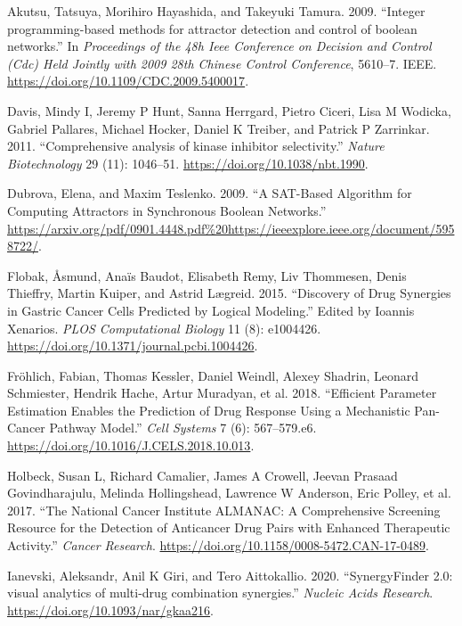 \documentclass[
  12pt,
]{book}
\newlength{\cslhangindent}
\newenvironment{cslreferences}%
  {\setlength{\parindent}{0pt}%
  \everypar{\setlength{\hangindent}{\cslhangindent}}\ignorespaces}%
  {\par}
\begin{document}
\hypertarget{refs}{}
\begin{cslreferences}
\leavevmode\hypertarget{ref-Akutsu2009}{}%
Akutsu, Tatsuya, Morihiro Hayashida, and Takeyuki Tamura. 2009. ``Integer programming-based methods for attractor detection and control of boolean networks.'' In \emph{Proceedings of the 48h Ieee Conference on Decision and Control (Cdc) Held Jointly with 2009 28th Chinese Control Conference}, 5610--7. IEEE. \url{https://doi.org/10.1109/CDC.2009.5400017}.

\leavevmode\hypertarget{ref-Davis2011}{}%
Davis, Mindy I, Jeremy P Hunt, Sanna Herrgard, Pietro Ciceri, Lisa M Wodicka, Gabriel Pallares, Michael Hocker, Daniel K Treiber, and Patrick P Zarrinkar. 2011. ``Comprehensive analysis of kinase inhibitor selectivity.'' \emph{Nature Biotechnology} 29 (11): 1046--51. \url{https://doi.org/10.1038/nbt.1990}.

\leavevmode\hypertarget{ref-Dubrova2009}{}%
Dubrova, Elena, and Maxim Teslenko. 2009. ``A SAT-Based Algorithm for Computing Attractors in Synchronous Boolean Networks.'' \url{https://arxiv.org/pdf/0901.4448.pdf\%20https://ieeexplore.ieee.org/document/5958722/}.

\leavevmode\hypertarget{ref-Flobak2015}{}%
Flobak, Åsmund, Anaïs Baudot, Elisabeth Remy, Liv Thommesen, Denis Thieffry, Martin Kuiper, and Astrid Lægreid. 2015. ``Discovery of Drug Synergies in Gastric Cancer Cells Predicted by Logical Modeling.'' Edited by Ioannis Xenarios. \emph{PLOS Computational Biology} 11 (8): e1004426. \url{https://doi.org/10.1371/journal.pcbi.1004426}.

\leavevmode\hypertarget{ref-Frohlich2018}{}%
Fröhlich, Fabian, Thomas Kessler, Daniel Weindl, Alexey Shadrin, Leonard Schmiester, Hendrik Hache, Artur Muradyan, et al. 2018. ``Efficient Parameter Estimation Enables the Prediction of Drug Response Using a Mechanistic Pan-Cancer Pathway Model.'' \emph{Cell Systems} 7 (6): 567--579.e6. \url{https://doi.org/10.1016/J.CELS.2018.10.013}.

\leavevmode\hypertarget{ref-Holbeck2017}{}%
Holbeck, Susan L, Richard Camalier, James A Crowell, Jeevan Prasaad Govindharajulu, Melinda Hollingshead, Lawrence W Anderson, Eric Polley, et al. 2017. ``The National Cancer Institute ALMANAC: A Comprehensive Screening Resource for the Detection of Anticancer Drug Pairs with Enhanced Therapeutic Activity.'' \emph{Cancer Research}. \url{https://doi.org/10.1158/0008-5472.CAN-17-0489}.

\leavevmode\hypertarget{ref-Ianevski2020}{}%
Ianevski, Aleksandr, Anil K Giri, and Tero Aittokallio. 2020. ``SynergyFinder 2.0: visual analytics of multi-drug combination synergies.'' \emph{Nucleic Acids Research}. \url{https://doi.org/10.1093/nar/gkaa216}.


\end{cslreferences}
\end{document}
